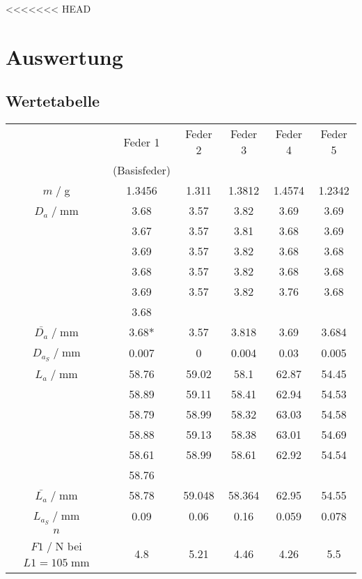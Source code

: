 <<<<<<< HEAD
\newpage
\section{Auswertung}
\subsection{Wertetabelle}
\begin{table}[H]
    \centering
    \begin{tabular}{c | c c c c c}
        \toprule
        & Feder 1 & Feder 2 & Feder 3 & Feder 4 & Feder 5 \\ & (Basisfeder)\\
        \midrule
        $m\;/\;$g & 1.3456 & 1.311 & 1.3812 & 1.4574 & 1.2342 \\
        \midrule
        $D_a\;/\;$mm & 3.68 & 3.57 & 3.82 & 3.69 & 3.69 \\
          & 3.67 & 3.57 & 3.81 & 3.68 & 3.69 \\
          & 3.69 & 3.57 & 3.82 & 3.68 & 3.68 \\
          & 3.68 & 3.57 & 3.82 & 3.68 & 3.68 \\
          & 3.69 & 3.57 & 3.82 & 3.76 & 3.68 \\
          & 3.68 &         &         &         &         \\
        \midrule
        $\bar{D_a}\;/\;$mm & 3.68* & 3.57 & 3.818 & 3.69 & 3.684\\
        $D_{a_S}\;/\;$mm& 0.007 & 0 & 0.004 & 0.03 & 0.005\\
        \midrule
        $L_a\;/\;$mm & 58.76 & 59.02 & 58.1 & 62.87 & 54.45 \\
          & 58.89 & 59.11 & 58.41 & 62.94 & 54.53 \\
          & 58.79 & 58.99 & 58.32 & 63.03 & 54.58 \\
          & 58.88 & 59.13 & 58.38 & 63.01 & 54.69 \\
          & 58.61 & 58.99 & 58.61 & 62.92 & 54.54 \\
          & 58.76 &         &         &         &         \\
        \midrule
        $\bar{L_a}\;/\;$mm & 58.78 & 59.048 & 58.364 & 62.95 & 54.55\\
        $L_{a_S}\;/\;$mm & 0.09 & 0.06 & 0.16 & 0.059 & 0.078\\
        $n$ & & & & & \\
        \midrule
        $F1\;/\;$N bei $L1=105\;$mm & 4.8 & 5.21 & 4.46 & 4.26 & 5.5\\

\end{tabular}
\end{table}
